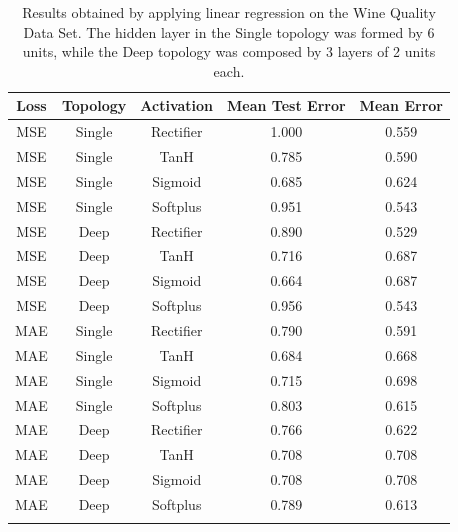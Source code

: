 \documentclass[10pt,journal,A4paper,compsoc,epsfig]{IEEEtran}
\begin{document}
\begin{table}
\centering
\begin{tabular}{c c c c c}
Loss & Topology & Activation & Mean Test Error & Mean Error \\ 
\hline 
\noalign{\medskip}
MSE & Single & Rectifier & 1.000 & 0.559 \\ \noalign{\smallskip}
MSE & Single & TanH & 0.785 & 0.590 \\ \noalign{\smallskip}
MSE & Single & Sigmoid & 0.685 & 0.624 \\ \noalign{\smallskip}
MSE & Single & Softplus & 0.951 & 0.543 \\ \noalign{\smallskip}
MSE & Deep & Rectifier & 0.890 & 0.529 \\ \noalign{\smallskip}
MSE & Deep & TanH & 0.716 & 0.687 \\ \noalign{\smallskip}
MSE & Deep & Sigmoid & 0.664 & 0.687 \\ \noalign{\smallskip}
MSE & Deep & Softplus & 0.956 & 0.543 \\ \noalign{\smallskip}
MAE & Single & Rectifier & 0.790 & 0.591 \\ \noalign{\smallskip}
MAE & Single & TanH & 0.684 & 0.668 \\ \noalign{\smallskip}
MAE & Single & Sigmoid & 0.715 & 0.698 \\ \noalign{\smallskip}
MAE & Single & Softplus & 0.803 & 0.615 \\ \noalign{\smallskip}
MAE & Deep & Rectifier & 0.766 & 0.622 \\ \noalign{\smallskip}
MAE & Deep & TanH & 0.708 & 0.708 \\ \noalign{\smallskip}
MAE & Deep & Sigmoid & 0.708 & 0.708 \\ \noalign{\smallskip}
MAE & Deep & Softplus & 0.789 & 0.613 \\ \noalign{\smallskip}
\hline \noalign{\medskip}
\end{tabular}
\caption{Results obtained by applying linear regression on the Wine Quality Data Set. The hidden layer in the Single topology was formed by 6 units, while the Deep topology was composed by 3 layers of 2 units each.}
\label{table_results_wine}
\end{table}%
\end{document}
